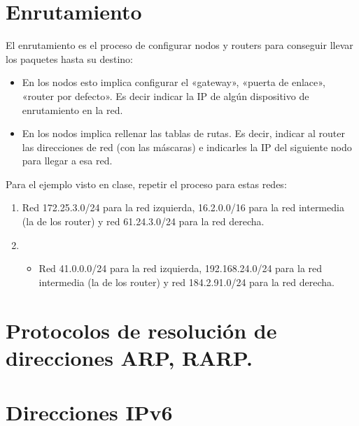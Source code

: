 \documentclass[letterpaper,10pt,spanish]{sphinxmanual}
\begin{document}
\section{Enrutamiento}
\label{\detokenize{t2_integracion_elementos/apuntes_t2:enrutamiento}}
\sphinxAtStartPar
El enrutamiento es el proceso de configurar nodos y routers para conseguir llevar los paquetes hasta su destino:
\begin{itemize}
\item {} 
\sphinxAtStartPar
En los nodos esto implica configurar el «gateway», «puerta de enlace», «router por defecto». Es decir indicar la IP de algún dispositivo de enrutamiento en la red.

\item {} 
\sphinxAtStartPar
En los nodos implica rellenar las tablas de rutas. Es decir, indicar al router las direcciones de red (con las máscaras) e indicarles la IP del siguiente nodo para llegar a esa red.

\end{itemize}

\sphinxAtStartPar
Para el ejemplo visto en clase, repetir el proceso para estas redes:
\begin{enumerate}
%
\item {} 
\sphinxAtStartPar
Red 172.25.3.0/24 para la red izquierda, 16.2.0.0/16 para la red intermedia (la de los router) y red 61.24.3.0/24 para la red derecha.

\item {} \begin{itemize}
\item {} 
\sphinxAtStartPar
Red 41.0.0.0/24 para la red izquierda, 192.168.24.0/24 para la red intermedia (la de los router) y red 184.2.91.0/24 para la red derecha.

\end{itemize}

\end{enumerate}


\section{Protocolos de resolución de direcciones ARP, RARP.}
\label{\detokenize{t2_integracion_elementos/apuntes_t2:protocolos-de-resolucion-de-direcciones-arp-rarp}}

\section{Direcciones IPv6}
\label{\detokenize{t2_integracion_elementos/apuntes_t2:direcciones-ipv6}}
\end{document}
